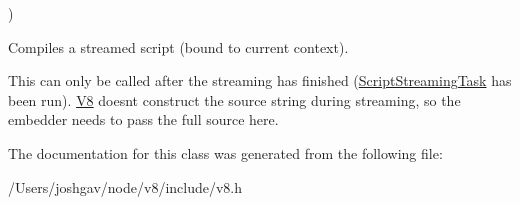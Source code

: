 {\begin{DoxyParamCaption}
\end{DoxyParamCaption}
)\hspace{0.3cm}{\ttfamily [static]}}\hypertarget{classv8_1_1_script_compiler_a60c0b0605f19607cce32e3eb776be13e}{}\label{classv8_1_1_script_compiler_a60c0b0605f19607cce32e3eb776be13e}
Compiles a streamed script (bound to current context).

This can only be called after the streaming has finished (\hyperlink{classv8_1_1_script_compiler_1_1_script_streaming_task}{Script\+Streaming\+Task} has been run). \hyperlink{classv8_1_1_v8}{V8} doesn\textquotesingle{}t construct the source string during streaming, so the embedder needs to pass the full source here. 

The documentation for this class was generated from the following file\+:\begin{DoxyCompactItemize}
\item 
/\+Users/joshgav/node/v8/include/v8.\+h\end{DoxyCompactItemize}
